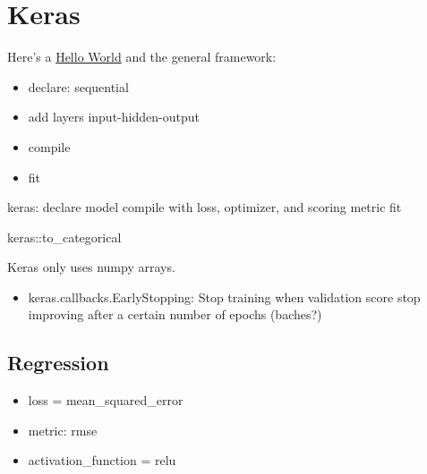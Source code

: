 \documentclass[]{book}
\providecommand{\tightlist}{%
  \setlength{\itemsep}{0pt}\setlength{\parskip}{0pt}}
\theoremstyle{definition}
\theoremstyle{definition}
\theoremstyle{definition}
\theoremstyle{remark}
\begin{document}
\section{Keras}\label{keras}

Here's a
\href{https://github.com/fastforwardlabs/keras-hello-world/blob/master/kerashelloworld.ipynb}{Hello
World} and the general framework:

\begin{itemize}
\item
  declare: sequential
\item
  add layers input-hidden-output
\item
  compile
\item
  fit
\end{itemize}

keras: declare model \textbar{} compile with loss, optimizer, and
scoring metric \textbar{} fit

keras::to\_categorical

Keras only uses numpy arrays.

\begin{itemize}
\tightlist
\item
  keras.callbacks.EarlyStopping: Stop training when validation score
  stop improving after a certain number of epochs (baches?)
\end{itemize}

\subsection{Regression}\label{regression}

\begin{itemize}
\item
  loss = mean\_squared\_error
\item
  metric: rmse
\item
  activation\_function = relu
\end{itemize}
\end{document}
